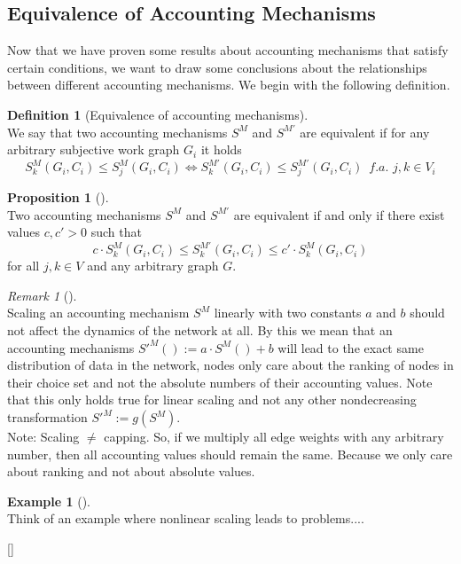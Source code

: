 \documentclass[11pt,a4paper]{article}
\theoremstyle{definition}
\newtheorem{definition}{Definition}[section]
\theoremstyle{theorem}
\theoremstyle{proposition}
\newtheorem{proposition}{Proposition}[section]
\theoremstyle{corollary}
\theoremstyle{lemma}
\theoremstyle{example}
\newtheorem{example}{Example}[section]
\theoremstyle{remark}
\newtheorem{remark}{Remark}[section]
\begin{document}
\subsection{Equivalence of Accounting Mechanisms}
\label{subsec:Equivalence of Accounting Mechanisms}
Now that we have proven some results about accounting mechanisms that satisfy certain conditions, we want to draw some conclusions about the relationships between different accounting mechanisms. We begin with the following definition. 
\begin{definition}[Equivalence of accounting mechanisms]\ \\
We say that two accounting mechanisms $S^M$ and $S^{M'}$ are equivalent if for any arbitrary subjective work graph $G_i$ it holds 
\[
S^M_k(G_i,C_i)\leq{}S^M_j(G_i,C_i) \Leftrightarrow S^{M'}_k(G_i,C_i)\leq{}S^{M'}_j(G_i,C_i)\,\,\,\textit{f.a. }j,k\in{}V_i
\]
\end{definition}

\begin{proposition}[]\ \\
Two accounting mechanisms $S^M$ and $S^{M'}$ are equivalent if and only if there exist values $c,c'>0$ such that 
\[
c\cdot{}S^M_k(G_i,C_i) \leq S^{M'}_k(G_i,C_i) \leq c'\cdot{}S^M_k(G_i,C_i) 
\]
for all $j,k\in{}V$ and any arbitrary graph $G$. 
\end{proposition}

\begin{remark}[]\ \\
Scaling an accounting mechanism $S^M$ linearly with two constants $a$ and $b$ should not affect the dynamics of the network at all. By this we mean that an accounting mechanisms $S'^M():=a\cdot{}S^M()+b$ will lead to the exact same distribution of data in the network, nodes only care about the ranking of nodes in their choice set and not the absolute numbers of their accounting values. Note that this only holds true for linear scaling and not any other nondecreasing transformation $S'^M:=g(S^M)$. \vspace{1em}\\

\noindent{}Note: Scaling $\neq$ capping. So, if we multiply all edge weights with any arbitrary number, then all accounting values should remain the same. Because we only care about ranking and not about absolute values.
\end{remark}

\begin{example}[]\ \\
Think of an example where nonlinear scaling leads to problems....
\end{example}[]\ \\
\end{document}
